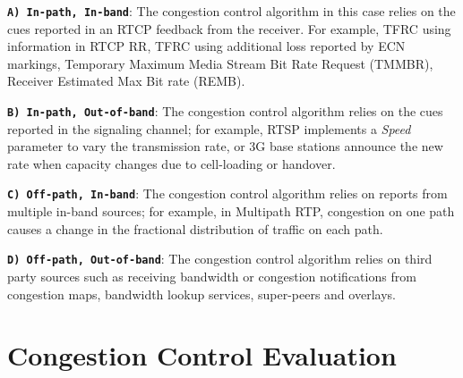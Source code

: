 \textbf{\texttt{A) In-path, In-band}}: The congestion control algorithm in
this case relies on the cues reported in an RTCP feedback from the receiver.
For example, TFRC using information in RTCP RR, TFRC using additional loss
reported by ECN markings, Temporary Maximum Media Stream Bit Rate Request
(TMMBR), Receiver Estimated Max Bit rate (REMB).

\textbf{\texttt{B) In-path, Out-of-band}}: The congestion control algorithm
relies on the cues reported in the signaling channel; for example, RTSP implements
a \emph{Speed} parameter to vary the transmission rate, or 3G base stations announce
the new rate when capacity changes due to cell-loading or handover.


\textbf{\texttt{C) Off-path, In-band}}: The congestion control algorithm
relies on reports from multiple in-band sources; for example, in Multipath
RTP, congestion on one path causes a change in the fractional distribution of
traffic on each path.

\textbf{\texttt{D) Off-path, Out-of-band}}: The congestion control
algorithm relies on third party sources such as receiving bandwidth or
congestion notifications from congestion maps, bandwidth lookup services,
super-peers and overlays.




\section{Congestion Control Evaluation}
\label{fw.cc.eval}


